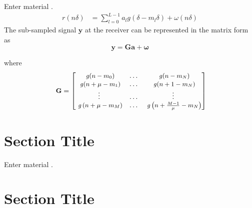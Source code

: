 {Enter material \cite{Zhang2004}.}
%
\begin{align}
\label{eq:TimeModel2a}
{r}(n \delta) &= {\sum_{l=0}^{L-1}a_l \mathit{g}(\delta - m_l \delta) + \omega(n \delta)}
\end{align}
%
The sub-sampled signal $\mathbf{y}$ at the receiver can be represented in the matrix form as
%
\begin{equation}
\label{eq:LinModel01}
\mathbf{y} = \mathbf{G} \mathbf{a} + \boldsymbol{\omega}
\end{equation}
%
{
where
%
\begin{equation}
\label{eq:P}
{\text{ \small $\mathbf{G}$}} = \left[
\begin{matrix}
\text{ \footnotesize $\mathit{g}(n-m_0)$}   & \ldots &   \text{ \footnotesize $\mathit{g}(n-m_N)$}\\
\text{ \footnotesize $\mathit{g}(n+{\mu}-m_1)$}   & \ldots &   \text{ \footnotesize $\mathit{g}(n+1-m_N)$}\\
\vdots             & \ldots &  \vdots      \\
\text{ \footnotesize $\mathit{g}\left(n+{\mu}-m_M\right)$} & \ldots &   \text{ \footnotesize $\mathit{g}\left(n+\frac{M-1}{\mu}-m_N\right)$}
\end{matrix} \right]
\end{equation}
%



\section{Section Title}

{Enter material \cite{Tesi2006}.}



\section{Section Title}

}
